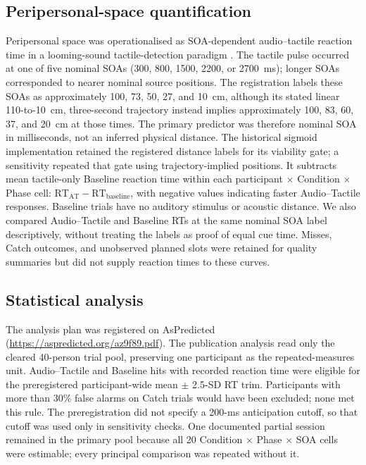 \subsection{Peripersonal-space quantification}

Peripersonal space was operationalised as SOA-dependent audio--tactile reaction time in a looming-sound tactile-detection paradigm \citep{Canzoneri2012, teneggi2013social, noel2015peripersonal}. The tactile pulse occurred at one of five nominal SOAs (300, 800, 1500, 2200, or 2700~ms); longer SOAs corresponded to nearer nominal source positions. The registration labels these SOAs as approximately 100, 73, 50, 27, and 10~cm, although its stated linear 110-to-10~cm, three-second trajectory instead implies approximately 100, 83, 60, 37, and 20~cm at those times. The primary predictor was therefore nominal SOA in milliseconds, not an inferred physical distance. The historical sigmoid implementation retained the registered distance labels for its viability gate; a sensitivity repeated that gate using trajectory-implied positions. It subtracts mean tactile-only Baseline reaction time within each participant $\times$ Condition $\times$ Phase cell: $\mathrm{RT}_{\mathrm{AT}}-\mathrm{RT}_{\mathrm{baseline}}$, with negative values indicating faster Audio--Tactile responses. Baseline trials have no auditory stimulus or acoustic distance. We also compared Audio--Tactile and Baseline RTs at the same nominal SOA label descriptively, without treating the labels as proof of equal cue time. Misses, Catch outcomes, and unobserved planned slots were retained for quality summaries but did not supply reaction times to these curves.

\subsection{Statistical analysis}
\label{study5:sec:stats}

The analysis plan was registered on AsPredicted (\url{https://aspredicted.org/az9f89.pdf}). The publication analysis read only the cleared 40-person trial pool, preserving one participant as the repeated-measures unit. Audio--Tactile and Baseline hits with recorded reaction time were eligible for the preregistered participant-wide mean $\pm$ 2.5-SD RT trim. Participants with more than 30\% false alarms on Catch trials would have been excluded; none met this rule. The preregistration did not specify a 200-ms anticipation cutoff, so that cutoff was used only in sensitivity checks. One documented partial session remained in the primary pool because all 20 Condition $\times$ Phase $\times$ SOA cells were estimable; every principal comparison was repeated without it.

